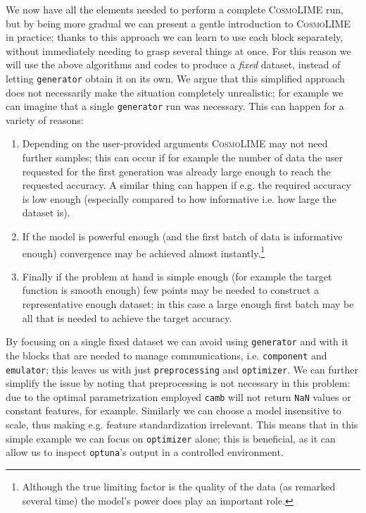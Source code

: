 We now have all the elements needed to perform a complete \textsc{CosmoLIME} run, but by being more gradual we can present a gentle introduction to \textsc{CosmoLIME} in practice; thanks to this approach we can learn to use each block separately, without immediately needing to grasp several things at once.
For this reason we will use the above algorithms and codes to produce a \emph{fixed} dataset, instead of letting \texttt{generator} obtain it on its own.
We argue that this simplified approach does not necessarily make the situation completely unrealistic; for example we can imagine that a single \texttt{generator} run was necessary. This can happen for a variety of reasons:
\begin{enumerate}
    \item Depending on the user-provided arguments \textsc{CosmoLIME} may not need further samples; this can occur if for example the number of data the user requested for the first generation was already large enough to reach the requested accuracy. A similar thing can happen if e.g. the required accuracy is low enough (especially compared to how informative i.e. how large the dataset is).
    \item If the model is powerful enough (and the first batch of data is informative enough) convergence may be achieved almost instantly.\footnote{Although the true limiting factor is the quality of the data (as remarked several time) the model's power does play an important role.}
    \item Finally if the problem at hand is simple enough (for example the target function is smooth enough) few points may be needed to construct a representative enough dataset; in this case a large enough first batch may be all that is needed to achieve the target accuracy.
\end{enumerate}

By focusing on a single fixed dataset we can avoid using \texttt{generator} and with it the blocks that are needed to manage communications, i.e. \texttt{component} and \texttt{emulator}; this leaves us with just \texttt{preprocessing} and \texttt{optimizer}. We can further simplify the issue by noting that preprocessing is not necessary in this problem: due to the optimal parametrization employed \texttt{camb} will not return \texttt{NaN} values or constant features, for example. Similarly we can choose a model insensitive to scale, thus making e.g. feature standardization irrelevant.
This means that in this simple example we can focus on \texttt{optimizer} alone; this is beneficial, as it can allow us to inspect \texttt{optuna}'s output in a controlled environment.

